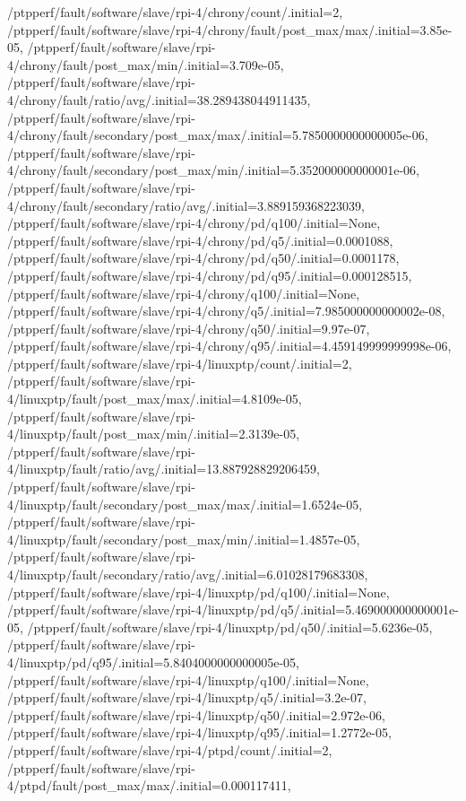 {    /ptpperf/fault/software/slave/rpi-4/chrony/count/.initial=2,
    /ptpperf/fault/software/slave/rpi-4/chrony/fault/post_max/max/.initial=3.85e-05,
    /ptpperf/fault/software/slave/rpi-4/chrony/fault/post_max/min/.initial=3.709e-05,
    /ptpperf/fault/software/slave/rpi-4/chrony/fault/ratio/avg/.initial=38.289438044911435,
    /ptpperf/fault/software/slave/rpi-4/chrony/fault/secondary/post_max/max/.initial=5.7850000000000005e-06,
    /ptpperf/fault/software/slave/rpi-4/chrony/fault/secondary/post_max/min/.initial=5.352000000000001e-06,
    /ptpperf/fault/software/slave/rpi-4/chrony/fault/secondary/ratio/avg/.initial=3.889159368223039,
    /ptpperf/fault/software/slave/rpi-4/chrony/pd/q100/.initial=None,
    /ptpperf/fault/software/slave/rpi-4/chrony/pd/q5/.initial=0.0001088,
    /ptpperf/fault/software/slave/rpi-4/chrony/pd/q50/.initial=0.0001178,
    /ptpperf/fault/software/slave/rpi-4/chrony/pd/q95/.initial=0.000128515,
    /ptpperf/fault/software/slave/rpi-4/chrony/q100/.initial=None,
    /ptpperf/fault/software/slave/rpi-4/chrony/q5/.initial=7.985000000000002e-08,
    /ptpperf/fault/software/slave/rpi-4/chrony/q50/.initial=9.97e-07,
    /ptpperf/fault/software/slave/rpi-4/chrony/q95/.initial=4.459149999999998e-06,
    /ptpperf/fault/software/slave/rpi-4/linuxptp/count/.initial=2,
    /ptpperf/fault/software/slave/rpi-4/linuxptp/fault/post_max/max/.initial=4.8109e-05,
    /ptpperf/fault/software/slave/rpi-4/linuxptp/fault/post_max/min/.initial=2.3139e-05,
    /ptpperf/fault/software/slave/rpi-4/linuxptp/fault/ratio/avg/.initial=13.887928829206459,
    /ptpperf/fault/software/slave/rpi-4/linuxptp/fault/secondary/post_max/max/.initial=1.6524e-05,
    /ptpperf/fault/software/slave/rpi-4/linuxptp/fault/secondary/post_max/min/.initial=1.4857e-05,
    /ptpperf/fault/software/slave/rpi-4/linuxptp/fault/secondary/ratio/avg/.initial=6.01028179683308,
    /ptpperf/fault/software/slave/rpi-4/linuxptp/pd/q100/.initial=None,
    /ptpperf/fault/software/slave/rpi-4/linuxptp/pd/q5/.initial=5.469000000000001e-05,
    /ptpperf/fault/software/slave/rpi-4/linuxptp/pd/q50/.initial=5.6236e-05,
    /ptpperf/fault/software/slave/rpi-4/linuxptp/pd/q95/.initial=5.8404000000000005e-05,
    /ptpperf/fault/software/slave/rpi-4/linuxptp/q100/.initial=None,
    /ptpperf/fault/software/slave/rpi-4/linuxptp/q5/.initial=3.2e-07,
    /ptpperf/fault/software/slave/rpi-4/linuxptp/q50/.initial=2.972e-06,
    /ptpperf/fault/software/slave/rpi-4/linuxptp/q95/.initial=1.2772e-05,
    /ptpperf/fault/software/slave/rpi-4/ptpd/count/.initial=2,
    /ptpperf/fault/software/slave/rpi-4/ptpd/fault/post_max/max/.initial=0.000117411,
}
